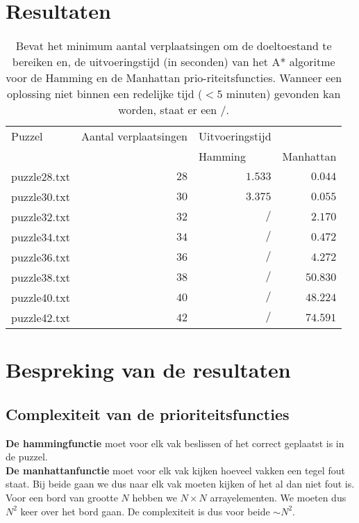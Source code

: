 \documentclass[a4paper]{article}
\numberwithin{equation}{section}
\begin{document}
    \pagebreak

    \section{Resultaten}
        \begin{table}[!ht]
            \centering
            \begin{tabular}{r r r r}
                \toprule
                \multicolumn{1}{l}{Puzzel} & \multicolumn{1}{l}{Aantal verplaatsingen} & \multicolumn{1}{l}{Uitvoeringstijd} &\\
                & &\multicolumn{1}{l}{Hamming}& \multicolumn{1}{l}{Manhattan} \\
                \midrule
                puzzle28.txt & $28$ & $1.533$ & $0.044$\\
                puzzle30.txt & $30$ & $3.375$ & $0.055$\\
                puzzle32.txt & $32$ & $/$ & $2.170$\\
                puzzle34.txt & $34$ & $/$ & $0.472$\\
                puzzle36.txt & $36$ & $/$ & $4.272$\\
                puzzle38.txt & $38$ & $/$ & $50.830$\\
                puzzle40.txt & $40$ & $/$ & $48.224$\\
                puzzle42.txt & $42$ & $/$ & $74.591$\\
                \bottomrule
            \end{tabular}
            \caption[Prestatie van het A* algoritme.]{Bevat het minimum aantal verplaatsingen om de doeltoestand te bereiken en,
               de uitvoeringstijd (in seconden) van het A* algoritme voor de Hamming en de Manhattan
                prio-riteitsfuncties. Wanneer een oplossing niet binnen een redelijke
                tijd ($< 5$ minuten) gevonden kan worden, staat er een $/$.}
            \label{tab:Prestatie A*}
        \end{table}

    \pagebreak

    \section{Bespreking van de resultaten}
        \subsection{Complexiteit van de prioriteitsfuncties}
            \textbf{De hammingfunctie} moet voor elk vak beslissen of het correct geplaatst is in de puzzel.
            \\\textbf{De manhattanfunctie} moet voor elk vak kijken hoeveel vakken een tegel fout staat.
            Bij beide gaan we dus naar elk vak moeten kijken of het al dan niet fout is. 
            \\Voor een bord van grootte $N$ hebben we 
            $N \times N$ arrayelementen. We moeten dus $N^2$ keer over het bord gaan. De complexiteit is dus voor beide $\sim N^2$.
           
\end{document}
